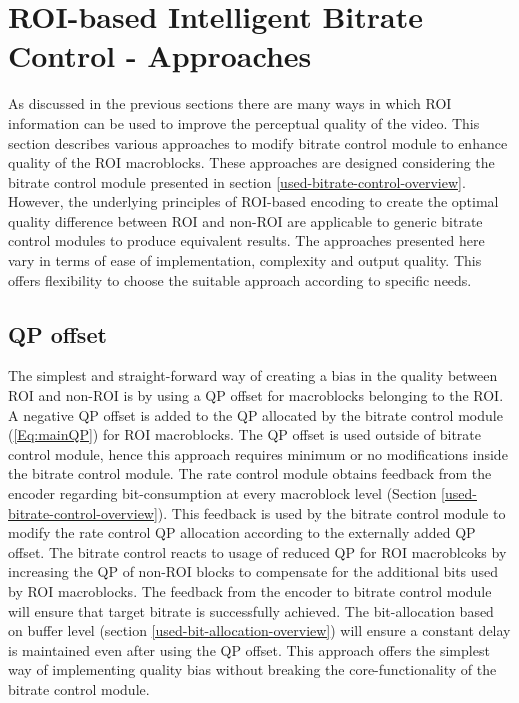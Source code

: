 \documentclass[11pt]{article} %
\begin{document}
\section{ROI-based Intelligent Bitrate Control - Approaches}
As discussed in the previous sections there are many ways in which ROI information can be used to improve the perceptual quality of the video. This section describes various approaches to modify bitrate control module to enhance quality of the ROI macroblocks. These approaches are designed considering the bitrate control module presented in section \ref{used-bitrate-control-overview}. However, the underlying principles of ROI-based encoding to create the optimal quality difference between ROI and non-ROI are applicable to generic bitrate control modules to produce equivalent results. The approaches presented here vary in terms of ease of implementation, complexity and output quality. This offers flexibility to choose the suitable approach according to specific needs.

\subsection{QP offset}
The simplest and straight-forward way of creating a bias in the quality between ROI and non-ROI is by using a QP offset for macroblocks belonging to the ROI. A negative QP offset is added to the QP allocated by the bitrate control module (\ref{Eq:mainQP}) for ROI macroblocks. The QP offset is used outside of bitrate control module, hence this approach requires minimum or no modifications inside the bitrate control module. The rate control module obtains feedback from the encoder regarding bit-consumption at every macroblock level (Section \ref{used-bitrate-control-overview}). This feedback is used by the bitrate control module to modify the rate control QP allocation according to the externally added QP offset. The bitrate control reacts to usage of reduced QP for ROI macroblcoks by increasing the QP of non-ROI blocks to compensate for the additional bits used by ROI macroblocks. The feedback from the encoder to bitrate control module will ensure that target bitrate is successfully achieved. The bit-allocation based on buffer level (section \ref{used-bit-allocation-overview}) will ensure a constant delay is maintained even after using the QP offset. This approach offers the simplest way of implementing quality bias without breaking the core-functionality of the bitrate control module.  
\end{document}
